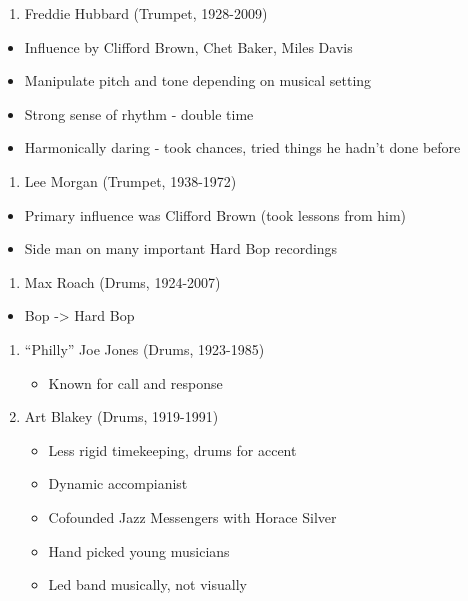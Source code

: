 \documentclass[]{article}
\providecommand{\tightlist}{%
  \setlength{\itemsep}{0pt}\setlength{\parskip}{0pt}}
\begin{document}
\begin{enumerate}
\def\labelenumi{\arabic{enumi}.}
\setcounter{enumi}{27}
\tightlist
\item
  Freddie Hubbard (Trumpet, 1928-2009)
\end{enumerate}

\begin{itemize}
\tightlist
\item
  Influence by Clifford Brown, Chet Baker, Miles Davis
\item
  Manipulate pitch and tone depending on musical setting
\item
  Strong sense of rhythm - double time
\item
  Harmonically daring - took chances, tried things he hadn't done before
\end{itemize}

\begin{enumerate}
\def\labelenumi{\arabic{enumi}.}
\setcounter{enumi}{28}
\tightlist
\item
  Lee Morgan (Trumpet, 1938-1972)
\end{enumerate}

\begin{itemize}
\tightlist
\item
  Primary influence was Clifford Brown (took lessons from him)
\item
  Side man on many important Hard Bop recordings
\end{itemize}

\begin{enumerate}
\def\labelenumi{\arabic{enumi}.}
\setcounter{enumi}{29}
\tightlist
\item
  Max Roach (Drums, 1924-2007)
\end{enumerate}

\begin{itemize}
\tightlist
\item
  Bop -\textgreater{} Hard Bop
\end{itemize}

\begin{enumerate}
\def\labelenumi{\arabic{enumi}.}
\setcounter{enumi}{30}
\tightlist
\item
  ``Philly'' Joe Jones (Drums, 1923-1985)

  \begin{itemize}
  \tightlist
  \item
    Known for call and response
  \end{itemize}
\item
  Art Blakey (Drums, 1919-1991)

  \begin{itemize}
  \tightlist
  \item
    Less rigid timekeeping, drums for accent
  \item
    Dynamic accompianist
  \item
    Cofounded Jazz Messengers with Horace Silver
  \item
    Hand picked young musicians
  \item
    Led band musically, not visually
  \end{itemize}
\end{enumerate}
\end{document}
